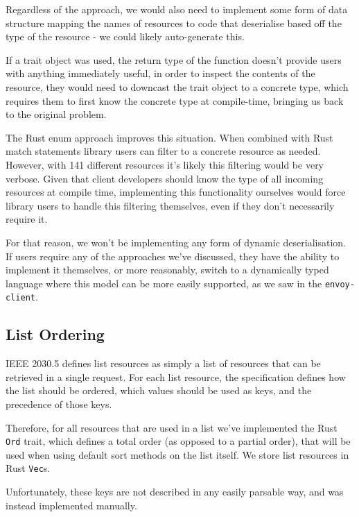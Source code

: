 Regardless of the approach, we would also need to implement some form of data structure mapping the names of resources to code that deserialise based off the type of the resource - we could likely auto-generate this.

If a trait object was used, the return type of the function doesn't provide users with anything immediately useful, in order to inspect the contents of the resource, they would need to downcast the trait object to a concrete type, which requires them to first know the concrete type at compile-time, bringing us back to the original problem.

The Rust enum approach improves this situation. When combined with Rust match statements library users can filter to a concrete resource as needed. However, with 141 different resources it's likely this filtering would be very verbose. Given that client developers should know the type of all incoming resources at compile time, implementing this functionality ourselves would force library users to handle this filtering themselves, even if they don't necessarily require it.

For that reason, we won't be implementing any form of dynamic deserialisation. If users require any of the approaches we've discussed, they have the ability to implement it themselves, or more reasonably, switch to a dynamically typed language where this model can be more easily supported, as we saw in the \texttt{envoy-client}.

\subsection{List Ordering}
IEEE 2030.5 defines list resources as simply a list of resources that can be retrieved in a single request. For each list resource, the specification defines how the list should be ordered, which values should be used as keys, and the precedence of those keys. \cite{IEEE2030.5}

Therefore, for all resources that are used in a list we've implemented the Rust \texttt{Ord} trait, which defines a total order (as opposed to a partial order), that will be used when using default sort methods on the list itself. We store list resources in Rust \texttt{Vec}s.

Unfortunately, these keys are not described in any easily parsable way, and was instead implemented manually.

